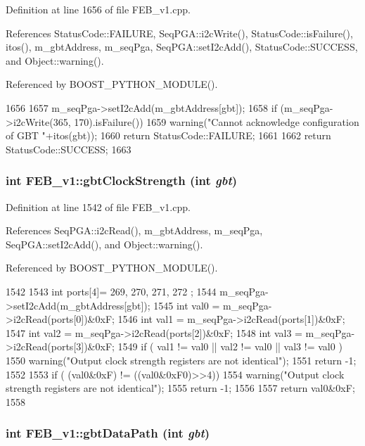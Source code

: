 Definition at line 1656 of file FEB\_\-v1.cpp.

References StatusCode::FAILURE, SeqPGA::i2cWrite(), StatusCode::isFailure(), itos(), m\_\-gbtAddress, m\_\-seqPga, SeqPGA::setI2cAdd(), StatusCode::SUCCESS, and Object::warning().

Referenced by BOOST\_\-PYTHON\_\-MODULE().


\begin{DoxyCode}
1656                                               {
1657   m_seqPga->setI2cAdd(m_gbtAddress[gbt]);
1658   if (m_seqPga->i2cWrite(365, 170).isFailure()){
1659     warning("Cannot acknowledge configuration of GBT "+itos(gbt));
1660     return StatusCode::FAILURE;
1661   }
1662   return StatusCode::SUCCESS;
1663 }
\end{DoxyCode}
\hypertarget{classFEB__v1_a6ca15de02d32e38a0fc90ad29302072e}{
\subsubsection[{gbtClockStrength}]{\setlength{\rightskip}{0pt plus 5cm}int FEB\_\-v1::gbtClockStrength (int {\em gbt})}}
\label{classFEB__v1_a6ca15de02d32e38a0fc90ad29302072e}


Definition at line 1542 of file FEB\_\-v1.cpp.

References SeqPGA::i2cRead(), m\_\-gbtAddress, m\_\-seqPga, SeqPGA::setI2cAdd(), and Object::warning().

Referenced by BOOST\_\-PYTHON\_\-MODULE().


\begin{DoxyCode}
1542                                    {
1543   int ports[4]={ 269, 270, 271, 272 };
1544   m_seqPga->setI2cAdd(m_gbtAddress[gbt]);
1545   int val0 = m_seqPga->i2cRead(ports[0])&0xF; 
1546   int val1 = m_seqPga->i2cRead(ports[1])&0xF; 
1547   int val2 = m_seqPga->i2cRead(ports[2])&0xF; 
1548   int val3 = m_seqPga->i2cRead(ports[3])&0xF; 
1549   if ( val1 != val0 || val2 != val0 || val3 != val0 ){
1550       warning("Output clock strength registers are not identical");
1551       return -1;
1552   }
1553   if ( (val0&0xF) != ((val0&0xF0)>>4)){
1554       warning("Output clock strength registers are not identical");
1555       return -1;
1556     }
1557   return val0&0xF;
1558 }
\end{DoxyCode}
\hypertarget{classFEB__v1_adf46e43506d1bd7cd26ca62c685e6c98}{
\subsubsection[{gbtDataPath}]{\setlength{\rightskip}{0pt plus 5cm}int FEB\_\-v1::gbtDataPath (int {\em gbt})}}
\label{classFEB__v1_adf46e43506d1bd7cd26ca62c685e6c98}


